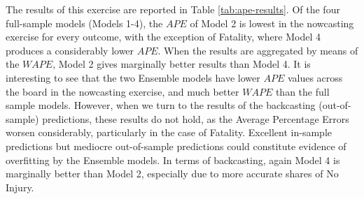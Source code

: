 \documentclass[]{elsarticle} %
\begin{document}
The results of this exercise are reported in Table
\ref{tab:ape-results}. Of the four full-sample models (Models 1-4), the
\(APE\) of Model 2 is lowest in the nowcasting exercise for every
outcome, with the exception of Fatality, where Model 4 produces a
considerably lower \(APE\). When the results are aggregated by means of
the \(WAPE\), Model 2 gives marginally better results than Model 4. It
is interesting to see that the two Ensemble models have lower \(APE\)
values across the board in the nowcasting exercise, and much better
\(WAPE\) than the full sample models. However, when we turn to the
results of the backcasting (out-of-sample) predictions, these results do
not hold, as the Average Percentage Errors worsen considerably,
particularly in the case of Fatality. Excellent in-sample predictions
but mediocre out-of-sample predictions could constitute evidence of
overfitting by the Ensemble models. In terms of backcasting, again Model
4 is marginally better than Model 2, especially due to more accurate
shares of No Injury.
\end{document}
